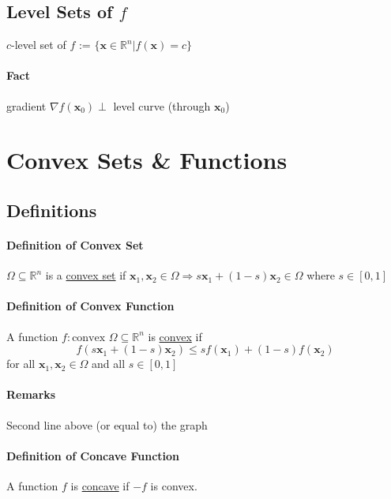 \documentclass[11pt]{article}
\newcommand{\tb}[1]{\textbf{#1}}
\newcommand{\real}[0]{\mathbb{R}}
\newcommand{\under}[1]{\underline{#1}}
\newcommand{\vx}[0]{\tb{x}}
\begin{document}
\subsection{Level Sets of $f$}
$c$-level set of $f$ := $\{ \vx \in \real^n | f(\vx) = c\}$
\paragraph{Fact} gradient $\nabla f(\vx_0) \perp$ level curve (through $\vx_0$)

\section{Convex Sets \& Functions}
\subsection{Definitions}
\paragraph{Definition of Convex Set}
$\Omega \subseteq \real^n$ is a \under{convex set} if
$\vx_1, \vx_2 \in \Omega \Rightarrow s\vx_1 + (1-s)\vx_2 \in \Omega$ where $s \in [0,1]$
\paragraph{Definition of Convex Function}
A function $f: \text{convex } \Omega \subseteq \real^n$ is \under{convex} if 
$$f(s\vx_1 + (1-s)\vx_2) \leq sf(\vx_1) + (1-s)f(\vx_2)$$
for all $\vx_1, \vx_2 \in \Omega$ and all $s \in [0, 1]$
\paragraph{Remarks}
Second line above (or equal to) the graph
\paragraph{Definition of Concave Function}
A function $f$ is \under{concave} if $-f$ is convex.
\end{document}
